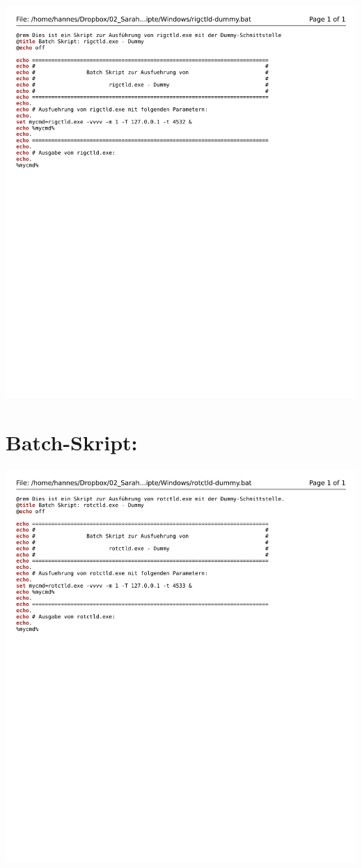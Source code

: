 \begin{center}
	\includegraphics[width=1\textwidth]{./appendicies/rigctld-dummy-windows}
\end{center}


\chapter{Batch-Skript: }
\label{chap:rotctlddummybat}

\begin{center}
	\includegraphics[width=1\textwidth]{./appendicies/rotctld-dummy-windows}
\end{center}

